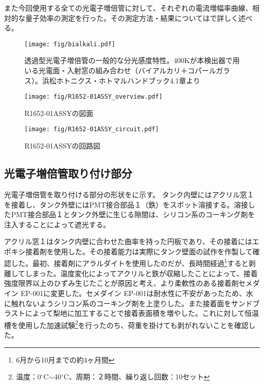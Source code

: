 また今回使用する全ての光電子増倍管に対して、それぞれの電流増幅率曲線、相対的な量子効率の測定を行った。その測定方法・結果についてはで詳しく述べる。

\begin{figure}[!h]
\centering
\texttt{[image: fig/bialkali.pdf]}
\caption[光電子増倍管の一般的な分光感度特性]{透過型光電子増倍管の一般的な分光感度特性。400Kが本検出器で用いる光電面・入射窓の組み合わせ（バイアルカリ＋コパールガラス）。浜松ホトニクス・ホトマルハンドブック4.1章より}
\label{Bialkali}
\end{figure}


\begin{figure}[htbp]
\centering
\texttt{[image: fig/R1652-01ASSY\_overview.pdf]}
\caption[R1652-01ASSYの寸法]{R1652-01ASSYの図面}
\label{LGPMT}
\end{figure}

\begin{figure}[htbp]
\centering
\texttt{[image: fig/R1652-01ASSY\_circuit.pdf]}
\caption[R1652-01ASSYの回路図]{R1652-01ASSYの回路図}
\label{LGPMTciruit}
\end{figure}
\fi


\subsection{光電子増倍管取り付け部分}

光電子増倍管を取り付ける部分の形状をに示す。
タンク内壁にはアクリル窓１を接着し、タンク外壁にはPMT接合部品１（鉄）をスポット溶接する。溶接したPMT接合部品１とタンク外壁に生じる隙間は、シリコン系のコーキング剤を注入することによって遮光する。

アクリル窓１はタンク内壁に合わせた曲率を持った円板であり、その接着にはエポキシ接着剤を使用した。その接着能力は実際にタンク壁面の試作を作製して確認した。最初、接着剤にアラルダイトを使用したのだが、長時間経過\footnote{6月から10月までの約4ヶ月間}すると剥離してしまった。温度変化によってアクリルと鉄が収縮したことによって、接着強度限界以上のひずみ生じたことが原因と考え、より柔軟性のある接着剤セメダイン EP-001に変更した。セメダイン EP-001は耐水性に不安があったため、水に触れないようシリコン系のコーキング剤を上塗りした。また接着面をサンドブラストによって梨地に加工することで接着表面積を増やした。これに対して恒温槽を使用した加速試験\footnote{温度：0$^{\circ}$C$\sim$40$^{\circ}$C、周期：２時間、繰り返し回数：10セット}を行ったのち、荷重を掛けても剥がれないことを確認した。

